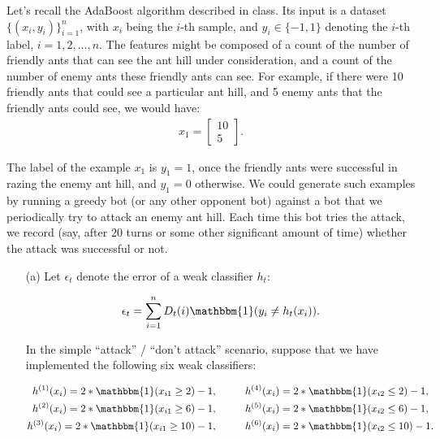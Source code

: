 \documentclass[10pt]{article}
\begin{document}
\begin{enumerate}[1.]
	    Let's recall the AdaBoost algorithm described in class. Its input is a dataset $\{(x_{i},y_{i})\}_{i=1}^{n}$, with $x_i$ being the $i$-th sample, and $y_{i}\in \{-1,1\}$ denoting the $i$-th label, $i=1,2,...,n$. The features might be composed of a count of the number of friendly ants that can see the ant hill under consideration, and a count of the number of enemy ants these friendly ants can see. For example, if there were 10 friendly ants that could see a particular ant hill, and 5 enemy ants that the friendly ants could see, we would have:
	    \begin{align*}
		    x_1 = \begin{bmatrix}
			10 \\
			5
		    \end{bmatrix}.
	    \end{align*}

	    The label of the example $x_{1}$ is $y_{1} = 1$, once the friendly ants were successful in razing the enemy ant hill, and $y_{1} = 0$ otherwise. We could generate such examples by running a greedy bot (or any other opponent bot) against a bot that we periodically try to attack an enemy ant hill. Each time this bot tries the attack, we record (say, after $20$ turns or some other significant amount of time) whether the attack was successful or not.

	    \begin{itemize}
            \item[(a)] Let $\epsilon_t$ denote the error of a weak classifier $h_t$:
		        
            \begin{equation}
		            \epsilon_{t} = \sum_{i=1}^{n} D_{t}(i) \mathbbm{1}(y_{i} \neq h_{t}(x_{i})).
		        \end{equation}
		        
                In the simple “attack” / “don't attack” scenario, suppose that we have implemented the following six weak classifiers:
		        
                \begin{align*}
		            h^{(1)}(x_{i}) = 2 * \mathbbm{1}(x_{i1} \geq 2) - 1, \hspace{1cm}  & h^{(4)}(x_{i}) = 2 * \mathbbm{1}(x_{i2} \leq 2) - 1,  \\
			        h^{(2)}(x_{i}) = 2 * \mathbbm{1}(x_{i1} \geq 6) - 1, \hspace{1cm}  & h^{(5)}(x_{i}) = 2 * \mathbbm{1}(x_{i2} \leq 6) - 1,  \\
			        h^{(3)}(x_{i}) = 2 * \mathbbm{1}(x_{i1} \geq 10) - 1, \hspace{1cm} & h^{(6)}(x_{i}) = 2 * \mathbbm{1}(x_{i2} \leq 10) - 1. \\
		        \end{align*}
		        

\end{itemize}
\end{enumerate}
\end{document}
